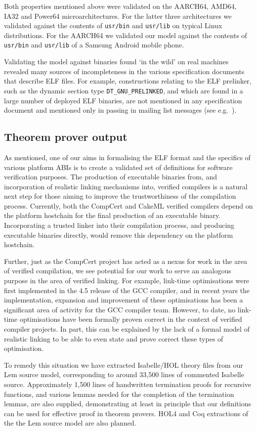 Both properties mentioned above were validated on the AARCH64, AMD64, IA32 and Power64 microarchitectures.
For the latter three architectures we validated against the contents of \texttt{usr/bin} and \texttt{usr/lib} on typical Linux distributions.
For the AARCH64 we validated our model against the contents of \texttt{usr/bin} and \texttt{usr/lib} of a Samsung Android mobile phone.

Validating the model against binaries found `in the wild' on real machines revealed many sources of incompleteness in the various specification documents that describe ELF files.
For example, constructions relating to the ELF prelinker, such as the dynamic section type \texttt{DT\_GNU\_PRELINKED}, and which are found in a large number of deployed ELF binaries, are not mentioned in any specification document and mentioned only in passing in mailing list messages (see e.g.~\cite{jelinek-prelinker-2001}).

\subsection{Theorem prover output}
\label{subsect.theorem.prover.output}

As mentioned, one of our aims in formalising the ELF format and the specifics of various platform ABIs is to create a validated set of definitions for software verification purposes.
The production of executable binaries from, and incorporation of realistic linking mechanisms into, verified compilers is a natural next step for those aiming to improve the trustworthiness of the compilation process.
Currently, both the CompCert and CakeML verified compilers depend on the platform hostchain for the final production of an executable binary.
Incorporating a trusted linker into their compilation process, and producing executable binaries directly, would remove this dependency on the platform hostchain.

Further, just as the CompCert project has acted as a nexus for work in the area of verified compilation, we see potential for our work to serve an analogous purpose in the area of verified linking.
For example, link-time optimisations were first implemented in the 4.5 release of the GCC compiler, and in recent years the implementation, expansion and improvement of these optimisations has been a significant area of activity for the GCC compiler team.
However, to date, no link-time optimisations have been formally proven correct in the context of verified compiler projects.
In part, this can be explained by the lack of a formal model of realistic linking to be able to even state and prove correct these types of optimisation.

To remedy this situation we have extracted Isabelle/HOL theory files from our Lem source model, corresponding to around 33,500 lines of commented Isabelle source.
Approximately 1,500 lines of handwritten termination proofs for recursive functions, and various lemmas needed for the completion of the termination lemmas, are also supplied, demonstrating at least in principle that our definitions can be used for effective proof in theorem provers.
HOL4 and Coq extractions of the the Lem source model are also planned.
